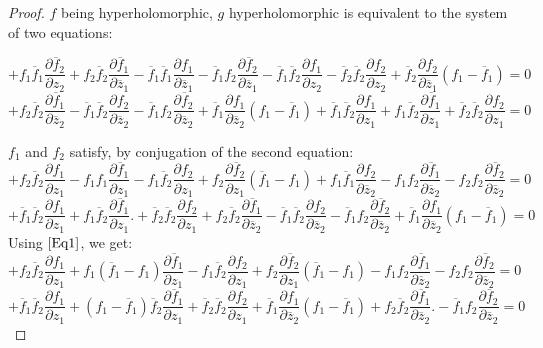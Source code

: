 \documentclass[12pt]{amsart}
\theoremstyle{definition}
\begin{document}
\begin{proof}
$f$ being hyperholomorphic, $g$ hyperholomorphic is equivalent to the system of two equations:

$$
+f_1\overline f_1\frac{\partial\overline f_2}{\partial z_2} +f_2\overline f_2\frac{\partial\overline f_1}{\partial \overline z_1} -\overline f_1\overline f_1\frac{\partial f_1}{\partial \overline z_1}-\overline f_1f_2\frac{\partial\overline f_2}{\partial \overline z_1}-\overline f_1\overline f_2\frac{\partial f_1}{\partial z_2}-
\overline f_2\overline f_2\frac{\partial f_2}{\partial z_2}+\overline f_2\frac{\partial f_2}{\partial \overline z_1}(f_1-\overline f_1)=0
$$
$$
+f_2\overline f_2\frac{\partial\overline f_1}{\partial \overline z_2}-\overline f_1\overline f_2\frac{\partial f_2}{\partial \overline z_2}-\overline f_1 f_2\frac{\partial\overline f_2}{\partial \overline z_2}+\overline f_1\frac{\partial f_1}{\partial \overline z_2}(f_1-\overline f_1)
+\overline f_1\overline f_2\frac{\partial f_1}{\partial z_1}+ f_1\overline f_2\frac{\partial\overline f_1}{\partial z_1}+
\overline f_2\overline f_2\frac{\partial f_2}{\partial z_1}=0
$$

$f_1$ and $f_2$ satisfy, by conjugation of the second equation:
$$ +f_2\overline f_2\frac{\partial f_1}{\partial z_1} - f_1 f_1\frac{\partial\overline f_1}{\partial z_1}-f_1\overline f_2\frac{\partial f_2}{\partial z_1} + f_2\frac{\partial\overline f_2}{\partial z_1}(\overline f_1-f_1) +f_1\overline f_1\frac{\partial f_2}{\partial\overline z_2}-f_1f_2\frac{\partial \overline f_1}{\partial\overline z_2}-f_2f_2\frac{\partial\overline f_2}{\partial\overline z_2}=0
$$
$$
+\overline f_1\overline f_2\frac{\partial f_1}{\partial z_1}+ f_1\overline f_2\frac{\partial\overline f_1}{\partial z_1}.+
\overline f_2\overline f_2\frac{\partial f_2}{\partial z_1}+f_2\overline f_2\frac{\partial\overline f_1}{\partial \overline z_2}-\overline f_1\overline f_2\frac{\partial f_2}{\partial \overline z_2}-\overline f_1 f_2\frac{\partial\overline f_2}{\partial \overline z_2}+\overline f_1\frac{\partial f_1}{\partial \overline z_2}(f_1-\overline f_1)
=0
$$ 
Using $\eqref{Eq1}$, we get: 
$$
+f_2\overline f_2\frac{\partial f_1}{\partial z_1} + f_1 (\overline f_1- f_1)\frac{\partial\overline f_1}{\partial z_1}-f_1\overline f_2\frac{\partial f_2}{\partial z_1} + f_2\frac{\partial\overline f_2}{\partial z_1}(\overline f_1-f_1) -f_1f_2\frac{\partial \overline f_1}{\partial\overline z_2}-f_2f_2\frac{\partial\overline f_2}{\partial\overline z_2}=0
$$
$$
+\overline f_1\overline f_2\frac{\partial f_1}{\partial z_1}+ (f_1-\overline f_1)\overline f_2\frac{\partial\overline f_1}{\partial z_1}+
\overline f_2\overline f_2\frac{\partial f_2}{\partial z_1}+\overline f_1\frac{\partial f_1}{\partial \overline z_2}(f_1-\overline f_1)+f_2\overline f_2\frac{\partial\overline f_1}{\partial \overline z_2}.
-\overline f_1 f_2\frac{\partial\overline f_2}{\partial \overline z_2}=0
$$ 


\end{proof}
\end{document}
